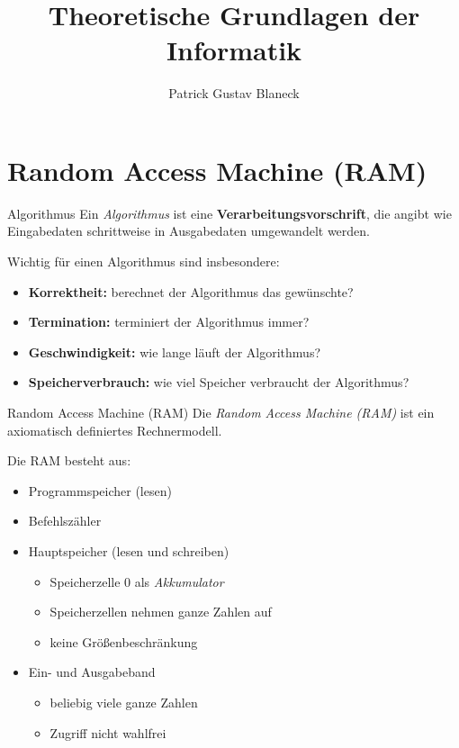 \documentclass[german]{spicker}
\title{Theoretische Grundlagen der Informatik}
\author{Patrick Gustav Blaneck}
\begin{document}
\maketitle
\tableofcontents
\newpage


\section{Random Access Machine (RAM)}

\begin{defi}{Algorithmus}
  Ein \emph{Algorithmus} ist eine \textbf{Verarbeitungsvorschrift}, die angibt wie Eingabedaten schrittweise in Ausgabedaten umgewandelt werden.

  Wichtig für einen Algorithmus sind insbesondere:
  \begin{itemize}
    \item \textbf{Korrektheit:} berechnet der Algorithmus das gewünschte?
    \item \textbf{Termination:} terminiert der Algorithmus immer?
    \item \textbf{Geschwindigkeit:} wie lange läuft der Algorithmus?
    \item \textbf{Speicherverbrauch:} wie viel Speicher verbraucht der Algorithmus?
  \end{itemize}
\end{defi}

\begin{defi}{Random Access Machine (RAM)}
  Die \emph{Random Access Machine (RAM)} ist ein axiomatisch definiertes Rechnermodell.

  Die RAM besteht aus:
  \begin{itemize}
    \item Programmspeicher (lesen)
    \item Befehlszähler
    \item Hauptspeicher (lesen und schreiben)
          \begin{itemize}
            \item Speicherzelle 0 als \emph{Akkumulator}
            \item Speicherzellen nehmen ganze Zahlen auf
            \item keine Größenbeschränkung
          \end{itemize}
    \item Ein- und Ausgabeband
          \begin{itemize}
            \item beliebig viele ganze Zahlen
            \item Zugriff nicht wahlfrei
          \end{itemize}
  \end{itemize}

  \begin{center}
  \end{center}
\end{defi}
\end{document}
